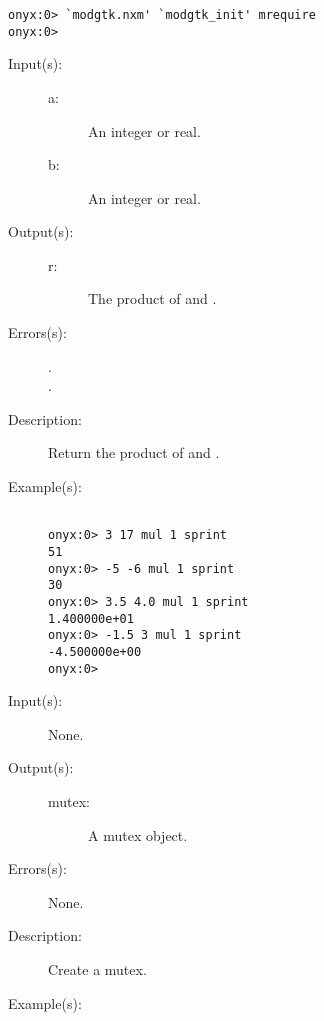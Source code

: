 \begin{description}
\begin{description}
\begin{verbatim}
onyx:0> `modgtk.nxm' `modgtk_init' mrequire
onyx:0>
	\end{verbatim}
	\end{description}
\label{systemdict:mul}
\item[{\onyxop{a b}{mul}{r}}: ]
	\begin{description}\item[]
	\item[Input(s): ]
		\begin{description}\item[]
		\item[a: ]
			An integer or real.
		\item[b: ]
			An integer or real.
		\end{description}
	\item[Output(s): ]
		\begin{description}\item[]
		\item[r: ]
			The product of  and .
		\end{description}
	\item[Errors(s): ]
		\begin{description}\item[]
		\item[.]
		\item[.]
		\end{description}
	\item[Description: ]
		Return the product of  and .
	\item[Example(s): ]\begin{verbatim}

onyx:0> 3 17 mul 1 sprint
51
onyx:0> -5 -6 mul 1 sprint
30
onyx:0> 3.5 4.0 mul 1 sprint
1.400000e+01
onyx:0> -1.5 3 mul 1 sprint
-4.500000e+00
onyx:0>
		\end{verbatim}
	\end{description}
\label{systemdict:mutex}
\item[{\onyxop{--}{mutex}{mutex}}: ]
	\begin{description}\item[]
	\item[Input(s): ] None.
	\item[Output(s): ]
		\begin{description}\item[]
		\item[mutex: ]
			A mutex object.
		\end{description}
	\item[Errors(s): ] None.
	\item[Description: ]
		Create a mutex.
	\item[Example(s): ]\begin{verbatim}


\end{verbatim}
\end{description}
\end{description}
